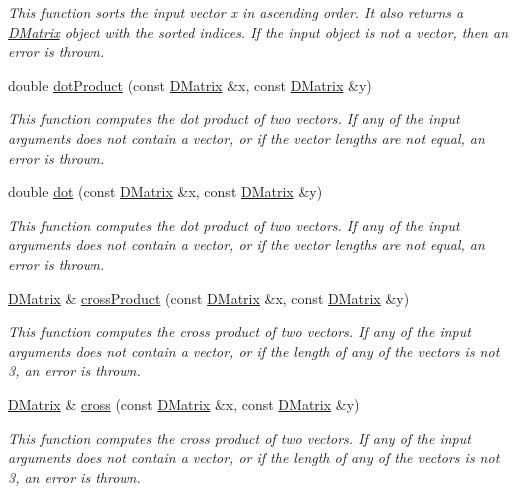 \begin{DoxyCompactItemize}
\begin{DoxyCompactList}\small\item\em This function sorts the input vector x in ascending order. It also returns a \hyperlink{classDMatrix}{DMatrix} object with the sorted indices. If the input object is not a vector, then an error is thrown. \item\end{DoxyCompactList}\item 
double \hyperlink{classDMatrix_a28b13c78f679925c43ba7743e4def95e}{dotProduct} (const \hyperlink{classDMatrix}{DMatrix} \&x, const \hyperlink{classDMatrix}{DMatrix} \&y)
\begin{DoxyCompactList}\small\item\em This function computes the dot product of two vectors. If any of the input arguments does not contain a vector, or if the vector lengths are not equal, an error is thrown. \item\end{DoxyCompactList}\item 
double \hyperlink{classDMatrix_ae80c19e8c19de710f5790698e9568756}{dot} (const \hyperlink{classDMatrix}{DMatrix} \&x, const \hyperlink{classDMatrix}{DMatrix} \&y)
\begin{DoxyCompactList}\small\item\em This function computes the dot product of two vectors. If any of the input arguments does not contain a vector, or if the vector lengths are not equal, an error is thrown. \item\end{DoxyCompactList}\item 
\hyperlink{classDMatrix}{DMatrix} \& \hyperlink{classDMatrix_a824f640d88220c84f5b31d9ed191c8ba}{crossProduct} (const \hyperlink{classDMatrix}{DMatrix} \&x, const \hyperlink{classDMatrix}{DMatrix} \&y)
\begin{DoxyCompactList}\small\item\em This function computes the cross product of two vectors. If any of the input arguments does not contain a vector, or if the length of any of the vectors is not 3, an error is thrown. \item\end{DoxyCompactList}\item 
\hyperlink{classDMatrix}{DMatrix} \& \hyperlink{classDMatrix_aaf0cb02dcd852ce56ccb39d550fa7c0a}{cross} (const \hyperlink{classDMatrix}{DMatrix} \&x, const \hyperlink{classDMatrix}{DMatrix} \&y)
\begin{DoxyCompactList}\small\item\em This function computes the cross product of two vectors. If any of the input arguments does not contain a vector, or if the length of any of the vectors is not 3, an error is thrown. \item\end{DoxyCompactList}\item 

\end{DoxyCompactItemize}
